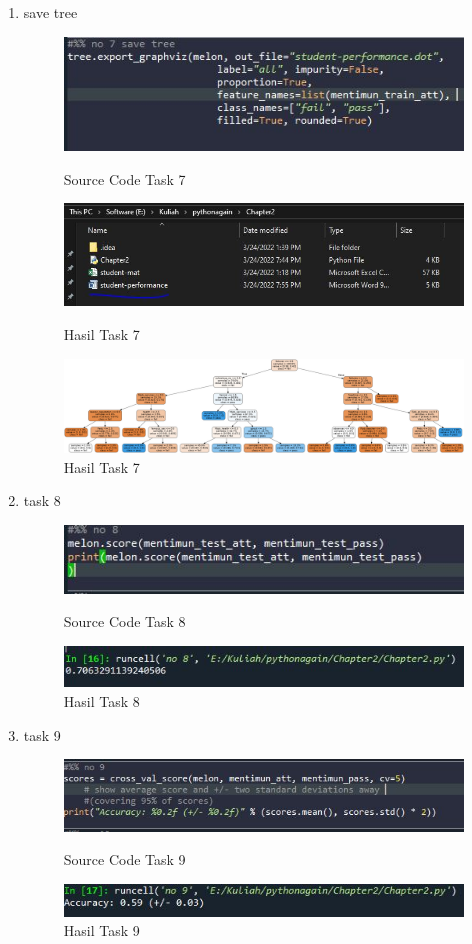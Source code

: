 \begin{enumerate}
\newpage
\item save tree
\begin{figure}[!htbp]
    \centering
    \includegraphics[scale=0.5]{figures/Chap7-1.JPG}
	\caption{Source Code Task 7}
    \includegraphics[scale=0.5]{figures/Chap7-1.1.JPG}
	\caption{Hasil Task 7}
    \includegraphics[scale=0.1]{figures/student-performance.png}
	\caption{Hasil Task 7}
\end{figure}

\item task 8
\begin{figure}[!htbp]
    \centering
    \includegraphics[scale=0.5]{figures/Chap8-1.JPG}
	\caption{Source Code Task 8}
    \includegraphics[scale=0.5]{figures/Chap8-1.1.JPG}
	\caption{Hasil Task 8}
\end{figure}


\item task 9
\begin{figure}[!htbp]
    \centering
    \includegraphics[scale=0.5]{figures/Chap9-1.JPG}
	\caption{Source Code Task 9}
    \includegraphics[scale=0.5]{figures/Chap9-1.1.JPG}
	\caption{Hasil Task 9}
\end{figure}


\end{enumerate}
